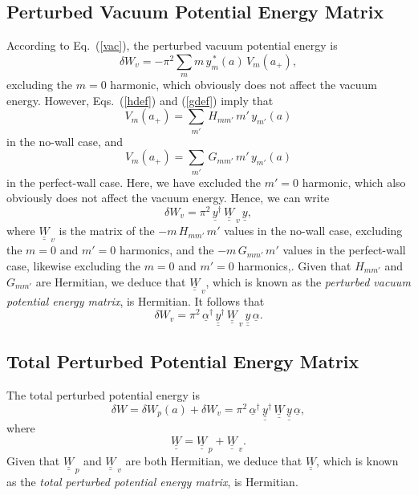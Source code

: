\documentclass[12pt,prb,aps]{revtex4-1}
\begin{document}
\subsection{Perturbed Vacuum Potential Energy Matrix}
According to Eq.~(\ref{vac}), the perturbed vacuum potential energy is
\begin{equation}
\delta W_v = - \pi^2\sum_m m\,y_m^{\,\ast}(a)\,V_m(a_+),
\end{equation}
excluding the $m=0$ harmonic, which 
obviously does not affect the vacuum energy. 
However, Eqs.~(\ref{hdef}) and (\ref{gdef}) imply that
\begin{equation}
V_m(a_+) = \sum_{m'}\,H_{mm'}\,m'\,y_{m'}(a)
\end{equation}
in the no-wall case, and 
\begin{equation}
V_m(a_+) = \sum_{m'}\,G_{mm'}\,m'\,y_{m'}(a)
\end{equation}
in the perfect-wall case. Here, we have excluded the $m'=0$ harmonic, which also obviously does not affect the vacuum energy. 
Hence, we can write
\begin{equation}
\delta W_v = \pi^2\,\underline{y}^\dag\,\underline{\underline{W}}_{\,v}\,\underline{y},
\end{equation}
where $\underline{\underline{W}}_{\,v}$ is the matrix of the $-m\,H_{mm'}\,m'$ values in the no-wall case, excluding the $m=0$ and $m'=0$ harmonics, and the
$-m\,G_{mm'}\,m'$ values in the perfect-wall case, likewise  excluding the $m=0$ and $m'=0$ harmonics,. Given that $H_{mm'}$ and $G_{mm'}$ are Hermitian, we deduce that $\underline{\underline{W}}_{\,v}$, which is known as the {\em perturbed vacuum potential energy matrix}, 
is Hermitian. It follows that
\begin{equation}
\delta W_v = \pi^2\,\underline{\alpha}^\dag\,\underline{\underline{y}}^\dag\,\underline{\underline{W}}_{\,v}\,\underline{\underline{y}}\,\underline{\alpha}.
\end{equation}

\subsection{Total Perturbed Potential Energy Matrix}
The total perturbed potential energy is
\begin{equation}
\delta W = \delta W_p(a) + \delta W_v = \pi^2\,\underline{\alpha}^\dag\,\underline{\underline{y}}^\dag\,\underline{\underline{W}}\,\underline{\underline{y}}\,\underline{\alpha},
\end{equation}
where 
\begin{equation}
\underline{\underline{W}} = \underline{\underline{W}}_{\,p} + \underline{\underline{W}}_{\,v}.
\end{equation}
Given that $\underline{\underline{W}}_{\,p}$ and $\underline{\underline{W}}_{\,v}$ are both Hermitian, we deduce that $\underline{\underline{W}}$,
which is known as the {\em total perturbed potential energy matrix},  is Hermitian.
\end{document}

